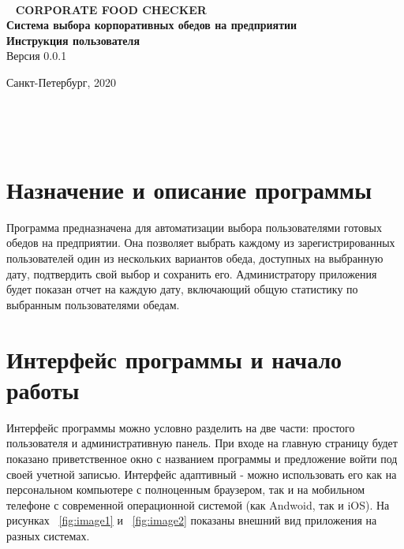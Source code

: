 \documentclass[a4paper]{article}
\begin{document}
\def\figurename{Рисунок}

\makeatletter
\lst@UserCommand{}
\makeatother
 
\begin{center}
 \hfill \break
\hfill\break
\hfill\break
\hfill \break
\hfill \break
\hfill \break
\hfill \break
\hfill \break
\hfill \break
\large{\textbf{CORPORATE FOOD CHECKER}}\\
\hfill \break
\hfill \break
\large{\textbf{Система выбора корпоративных обедов на предприятии}}\\
\large{\textbf{Инструкция пользователя}}\\
\hfill \break
\hfill \break
Версия 0.0.1\\
\hfill \break
\hfill \break
\hfill \break
\hfill \break
\hfill \break
\hfill \break
\hfill \break
\hfill \break
\hfill \break
\hfill \break
\hfill \break
\hfill \break
\hfill \break
\begin{center} Санкт-Петербург, 2020 \end{center}
\end{center}
\thispagestyle{empty}
 
 
\newpage 
    \tableofcontents %
\newpage

\section{Назначение и описание программы}

Программа предназначена для автоматизации выбора пользователями готовых обедов на предприятии. Она позволяет выбрать каждому из зарегистрированных пользователей один из нескольких вариантов обеда, доступных на выбранную дату, подтвердить свой выбор и сохранить его. Администратору приложения будет показан отчет на каждую дату, включающий общую статистику по выбранным пользователями обедам.

\section{Интерфейс программы и начало работы}

Интерфейс программы можно условно разделить на две части: простого пользователя и административную панель. При входе на главную страницу будет показано приветственное окно с названием программы и предложение войти под своей учетной записью. Интерфейс адаптивный - можно использовать его как на персональном компьютере с полноценным браузером, так и на мобильном телефоне с современной операционной системой (как Andwoid, так и iOS). На рисунках ~\ref{fig:image1} и ~\ref{fig:image2} показаны внешний вид приложения на разных системах.
\end{document}
